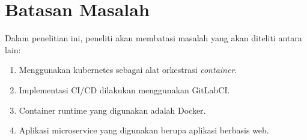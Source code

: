 \section{Batasan Masalah}
Dalam penelitian ini, peneliti akan membatasi masalah yang akan diteliti antara lain:
\begin{enumerate}[label=\alph*.]
    \item Menggunakan kubernetes sebagai alat orkestrasi \textit{container}.
    \item Implementasi CI/CD dilakukan menggunakan GitLabCI.
    \item Container runtime yang digunakan adalah Docker.
    \item Aplikasi microservice yang digunakan berupa aplikasi berbasis web.
\end{enumerate}

\newpage